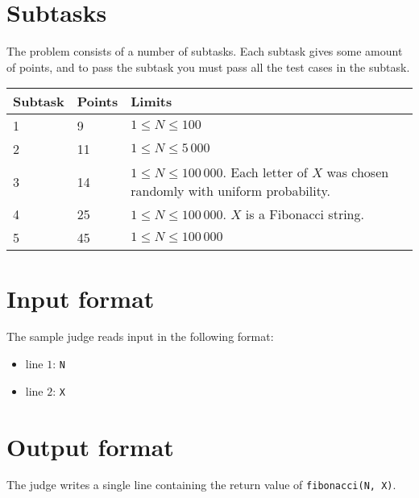 \section*{Subtasks}
The problem consists of a number of subtasks. Each subtask gives some amount of points, and to pass
the subtask you must pass all the test cases in the subtask.

\begin{tabular}{|l|l|l|}
  \hline
  \textbf{Subtask} & \textbf{Points} & \textbf{Limits} \\ \hline
  1 & 9 & $1 \le N \le 100$  \\ \hline
  2 & 11 & $1 \le N \le 5\,000$  \\ \hline
  3 & 14 & $1 \le N \le 100\,000$. Each letter of $X$ was chosen randomly with uniform probability.  \\ \hline
  4 & 25 & $1 \le N \le 100\,000$. $X$ is a Fibonacci string.  \\ \hline
  5 & 45 & $1 \le N \le 100\,000$  \\ \hline

\end{tabular}

\section*{Input format}
The sample judge reads input in the following format:

\begin{itemize}
  \item line $1$: \texttt{N}
  \item line $2$: \texttt{X}
\end{itemize}

\section*{Output format}
The judge writes a single line containing the return value of \texttt{fibonacci(N, X)}.
